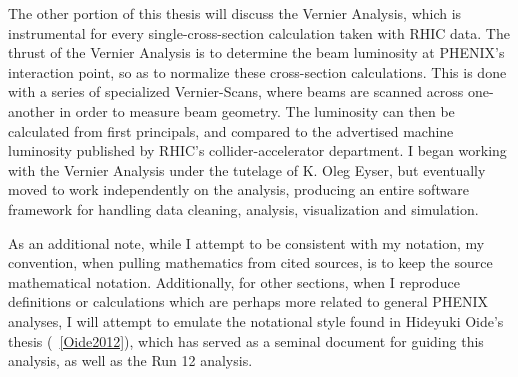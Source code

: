 The other portion of this thesis will discuss the Vernier Analysis, which is
instrumental for every single-cross-section calculation taken with RHIC data.
The thrust of the Vernier Analysis is to determine the beam luminosity at
PHENIX's interaction point, so as to normalize these cross-section calculations.
This is done with a series of specialized Vernier-Scans, where beams are scanned
across one-another in order to measure beam geometry. The luminosity can then be
calculated from first principals, and compared to the advertised machine
luminosity published by RHIC's collider-accelerator department. I began working
with the Vernier Analysis under the tutelage of K. Oleg Eyser, but eventually
moved to work independently on the analysis, producing an entire software
framework for handling data cleaning, analysis, visualization and simulation.

As an additional note, while I attempt to be consistent with my notation, my
convention, when pulling mathematics from cited sources, is to keep the source
mathematical notation. Additionally, for other sections, when I reproduce
definitions or calculations which are perhaps more related to general PHENIX
analyses, I will attempt to emulate the notational style found in Hideyuki
Oide's thesis (~\ref{Oide2012}), which has served as a seminal document for
guiding this analysis, as well as the Run 12 analysis.
